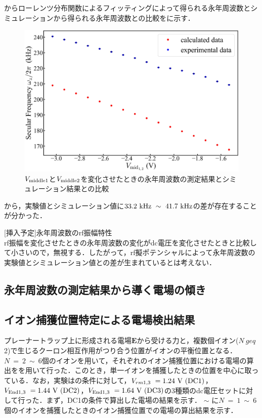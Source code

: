 からローレンツ分布関数によるフィッティングによって得られる永年周波数とシミュレーションから得られる永年周波数との比較をに示す．

\begin{figure}[h]
	\begin{center}
		\includegraphics[width = 0.6\linewidth]{./results/figure/Vmid-SecFreqZ.jpg}
		\caption{$V_{\rm middle1}$と$V_{\rm middle2}$を変化させたときの永年周波数の測定結果とシミュレーション結果との比較}
		\label{fig:mid12_MeasSec_SimSec}
	\end{center}
\end{figure}

から，実験値とシミュレーション値に$33.2 \ {\rm kHz} \ \sim \ 41.7 \ {\rm kHz}$の差が存在することが分かった．

[挿入予定]永年周波数のrf振幅特性 \\
rf振幅を変化させたときの永年周波数の変化がdc電圧を変化させたときと比較して小さいので，無視する．したがって，rf擬ポテンシャルによって永年周波数の実験値とシミュレーション値との差が生まれているとは考えない．

\clearpage

\subsection{永年周波数の測定結果から導く電場の傾き}

\subsection{イオン捕獲位置特定による電場検出結果}
プレーナートラップ上に形成される電場$\bm{E}$から受ける力と，複数個イオン($N \ geq$ 2)で生じるクーロン相互作用がつり合う位置がイオンの平衡位置となる．$N \ = \ 2 \ \sim \ 6$個のイオンを用いて，それぞれのイオン捕獲位置における電場の算出をを用いて行った．このとき，単一イオンを捕獲したときの位置を中心に取っている．なお，実験はの条件に対して，$V_{rm  1,3} \ = 1.24 \ {\rm V} \ ({\rm DC1})$，$V_{\rm End 1,3} \ = 1.44 \ {\rm V} \ ({\rm DC2})$，$V_{\rm End 1,3} \ = 1.64 \ {\rm V} \ ({\rm DC3})$の3種類のdc電圧セットに対して行った．まず，DC1の条件で算出した電場の結果を示す． $\sim$ に$N \ = \ 1 \ \sim \ 6$個のイオンを捕獲したときのイオン捕獲位置での電場の算出結果を示す．

